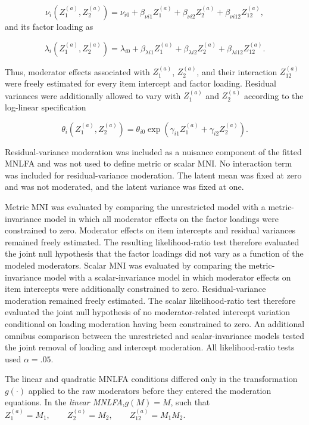 \documentclass[
  man,
  floatsintext]{apa7}
\begin{document}
\[
\nu_i\left(Z_1^{(a)},Z_2^{(a)}\right)
=
\nu_{i0}
+
\beta_{\nu i1}Z_1^{(a)}
+
\beta_{\nu i2}Z_2^{(a)}
+
\beta_{\nu i12}Z_{12}^{(a)},
\] and its factor loading as

\[
\lambda_i\left(Z_1^{(a)},Z_2^{(a)}\right)
=
\lambda_{i0}
+
\beta_{\lambda i1}Z_1^{(a)}
+
\beta_{\lambda i2}Z_2^{(a)}
+
\beta_{\lambda i12}Z_{12}^{(a)}.
\]

Thus, moderator effects associated with \(Z_1^{(a)}\), \(Z_2^{(a)}\),
and their interaction \(Z_{12}^{(a)}\) were freely estimated for every
item intercept and factor loading. Residual variances were additionally
allowed to vary with \(Z_1^{(a)}\) and \(Z_2^{(a)}\) according to the
log-linear specification

\[
\theta_i\left(Z_1^{(a)},Z_2^{(a)}\right)
=
\theta_{i0}
\exp\left(
\gamma_{i1}Z_1^{(a)}
+
\gamma_{i2}Z_2^{(a)}
\right).
\]

Residual-variance moderation was included as a nuisance component of the
fitted MNLFA and was not used to define metric or scalar MNI. No
interaction term was included for residual-variance moderation. The
latent mean was fixed at zero and was not moderated, and the latent
variance was fixed at one.

Metric MNI was evaluated by comparing the unrestricted model with a
metric-invariance model in which all moderator effects on the factor
loadings were constrained to zero. Moderator effects on item intercepts
and residual variances remained freely estimated. The resulting
likelihood-ratio test therefore evaluated the joint null hypothesis that
the factor loadings did not vary as a function of the modeled
moderators. Scalar MNI was evaluated by comparing the metric-invariance
model with a scalar-invariance model in which moderator effects on item
intercepts were additionally constrained to zero. Residual-variance
moderation remained freely estimated. The scalar likelihood-ratio test
therefore evaluated the joint null hypothesis of no moderator-related
intercept variation conditional on loading moderation having been
constrained to zero. An additional omnibus comparison between the
unrestricted and scalar-invariance models tested the joint removal of
loading and intercept moderation. All likelihood-ratio tests used
\(\alpha=.05\).

The linear and quadratic MNLFA conditions differed only in the
transformation \(g(\cdot)\) applied to the raw moderators before they
entered the moderation equations. In the \emph{linear MNLFA},\(g(M)=M\),
such
that\(Z_1^{(a)}=M_1,\qquad Z_2^{(a)}=M_2,\qquad Z_{12}^{(a)}=M_1M_2\).
\end{document}
